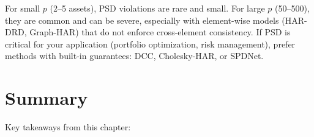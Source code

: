 \begin{warning}
For small $p$ (2--5 assets), PSD violations are rare and small. For large $p$
(50--500), they are common and can be severe, especially with element-wise
models (HAR-DRD, Graph-HAR) that do not enforce cross-element consistency.
If PSD is critical for your application (portfolio optimization, risk
management), prefer methods with built-in guarantees: DCC, Cholesky-HAR, or
SPDNet.
\end{warning}


\section{Summary}\label{sec:multivariate:summary}

Key takeaways from this chapter:

